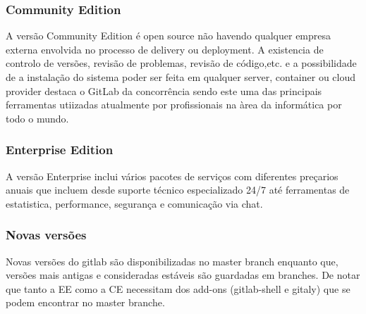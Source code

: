 \documentclass[12pt,a4paper]{article}
\begin{document}
\subsubsection{Community Edition}
A versão Community Edition é open source não havendo qualquer empresa externa envolvida no processo de delivery ou deployment. A existencia de controlo de versões, revisão de problemas, revisão de código,etc. e a possibilidade de a instalação do sistema poder ser feita em qualquer server, container ou cloud provider destaca o GitLab da concorrência sendo este uma das principais ferramentas utiizadas atualmente por profissionais na àrea da informática por todo o mundo.

\subsubsection{Enterprise Edition}
A versão Enterprise inclui vários pacotes de serviços com diferentes preçarios anuais que incluem desde suporte técnico especializado 24/7 até ferramentas de estatistica, performance, segurança e comunicação via chat.

\subsubsection{Novas versões}
Novas versões do gitlab são disponibilizadas no master branch enquanto que, versões mais antigas e consideradas estáveis são guardadas em branches. De notar que tanto  a EE como a CE necessitam dos add-ons (gitlab-shell e gitaly) que se podem encontrar no master branche.
\fi
\end{document}
